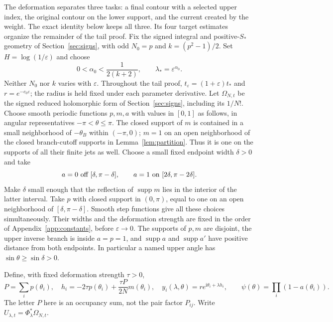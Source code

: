 \documentclass[11pt]{article}
\numberwithin{equation}{section}
\theoremstyle{definition}
\newcommand{\ii}{\mathrm i}
\newcommand{\eps}{\varepsilon}
\begin{document}
The deformation separates three tasks: a final contour with a selected
upper index, the original contour on the lower support, and the current
created by the weight. The exact identity below keeps all three. Its
four target estimates organize the remainder of the tail proof.
Fix the signed integral and positive-$S_*$ geometry of Section~\ref{sec:signs}, with odd $N_0=p$ and $k=(p^2-1)/2$.
Set \(H=\log(1/\eps)\) and choose
\begin{equation}
 0<\alpha_0<\frac1{2(k+2)},\qquad \lambda_*=\eps^{\alpha_0}.
 \label{eq:alphachoice}
\end{equation}
Neither \(N_0\) nor \(k\) varies with \(\eps\). Throughout the tail proof, $t_\eps=(1+\eps)t_*$ and $r=e^{-c_0\eps}$; the radius is held fixed under each parameter derivative.
Let $\Omega_{N,t}$ be the signed reduced holomorphic form of Section~\ref{sec:signs}, including its $1/N!$.
Choose smooth periodic functions \(p,m,a\) with values in \([0,1]\)
as follows, in angular representatives \(-\pi<\theta\le\pi\).
The closed support of \(m\) is contained in a small neighborhood of
\(-\theta_B\) within \((-\pi,0)\); \(m=1\) on an open neighborhood
of the closed branch-cutoff supports in Lemma~\ref{lem:partition}.
Thus it is one on the supports of all their finite jets as well.
Choose a small fixed endpoint width \(\delta>0\) and take
\[
 a=0\ \hbox{off }[\delta,\pi-\delta],\qquad
 a=1\ \hbox{on }[2\delta,\pi-2\delta].
\]
Make \(\delta\) small enough that the reflection of
\(\operatorname{supp}m\) lies in the interior of the latter interval.
Take \(p\) with closed support in \((0,\pi)\), equal to one on
an open neighborhood of \([\delta,\pi-\delta]\).
Smooth step functions give all these choices simultaneously.
Their widths and the deformation strength are fixed in the order
of Appendix~\ref{app:constants}, before \(\eps\to0\).
The supports of \(p,m\) are disjoint, the upper inverse branch is
inside \(a=p=1\), and \(\operatorname{supp}a\) and
\(\operatorname{supp}a'\) have positive distance from both endpoints.
In particular a named upper angle has \(\sin\theta\ge\sin\delta>0\).

Define, with fixed deformation strength \(\tau>0\),
\[
 P=\sum_i p(\theta_i),\quad
 h_i=-2\tau p(\theta_i)+\frac{\tau P}{2N}m(\theta_i),\quad
 y_i(\lambda,\theta)=r e^{\ii\theta_i+\lambda h_i},
 \qquad \psi(\theta)=\prod_i(1-a(\theta_i)).
\]
The letter \(P\) here is an occupancy sum, not the pair factor \(P_{ij}\).
Write \(U_{\lambda,t}=\Phi_\lambda^*\Omega_{N,t}\).
\end{document}
